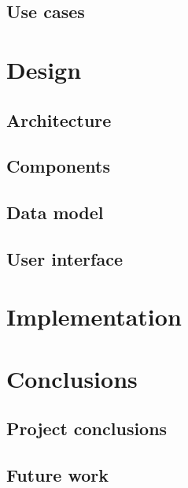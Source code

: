 \subsection{Use cases}\label{subsec:use-cases}


\section{Design}\label{sec:design}

\subsection{Architecture}\label{subsec:architecture}

\subsection{Components}\label{subsec:components}

\subsection{Data model}\label{subsec:data-model}

\subsection{User interface}\label{subsec:user-interface}


\section{Implementation}\label{sec:implementation}


\section{Conclusions}\label{sec:conclusions}

\subsection{Project conclusions}\label{subsec:project-conclusions}

\subsection{Future work}\label{subsec:future-work}
